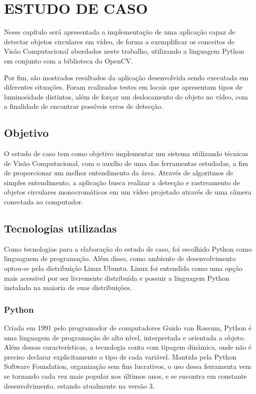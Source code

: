 \chapter{ESTUDO DE CASO}

Nesse capítulo será apresentada a implementação de uma aplicação capaz de detectar objetos circulares em vídeo, de forma a exemplificar os conceitos de Visão Computacional abordados neste trabalho, utilizando a linguagem Python em conjunto com a biblioteca do OpenCV.

Por fim, são mostrados resultados da aplicação desenvolvida sendo executada em diferentes situações. Foram realizados testes em locais que apresentam tipos de luminosidade distintos, além de forçar um deslocamento do objeto no vídeo, com a finalidade de encontrar possíveis erros de detecção.

\section{Objetivo}

O estudo de caso tem como objetivo implementar um sistema utilizando técnicas de Visão Computacional, com o auxílio de uma das ferramentas estudadas, a fim de proporcionar um melhor entendimento da área. Através de algoritmos de simples entendimento, a aplicação busca realizar a detecção e rastreamento de objetos circulares monocromáticos em um vídeo projetado através de uma câmera conectada ao computador.

\section{Tecnologias utilizadas}

	Como tecnologias para a elaboração do estudo de caso, foi escolhido Python como linguaguem de programação. Além disso, como ambiente de desenvolvimento optou-se pela distribuição Linux Ubuntu. Linux foi entendida como uma opção mais acessível por ser livremente distribuída e possuir a linguagem Python instalada na maioria de suas distribuições.

\subsection{Python}

Criada em 1991 pelo programador de computadores Guido van Rossum, Python é uma linguagem de programação de alto nível, interpretada e orientada a objeto. Além dessas características, a tecnologia conta com tipagem dinâmica, onde não é preciso declarar explicitamente o tipo de cada variável. Mantida pela Python Software Foundation, organização sem fins lucrativos, o uso dessa ferramenta vem se tornando cada vez mais popular nos últimos anos, e se encontra em constante desenvolvimento, estando atualmente na versão 3.

